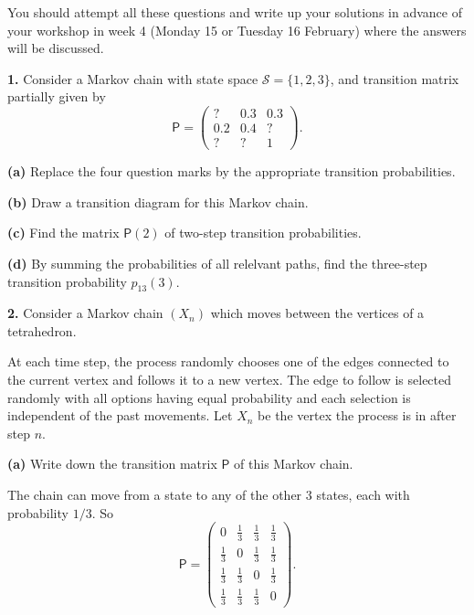 \documentclass[
  a4paper,
]{article}
\newif\ifcomm\commtrue
\theoremstyle{definition}
\theoremstyle{definition}
\theoremstyle{definition}
\theoremstyle{remark}
\begin{document}
\commfalse

You should attempt all these questions and write up your solutions in advance of your workshop in week 4 (Monday 15 or Tuesday 16 February) where the answers will be discussed.

\textbf{1.} Consider a Markov chain with state space \(\mathcal S = \{1,2,3\}\), and transition matrix partially given by
\[ \mathsf P = \begin{pmatrix} ? & 0.3 & 0.3 \\ 0.2 & 0.4 & ? \\ ? & ? & 1 \end{pmatrix} . \]

\textbf{(a)} Replace the four question marks by the appropriate transition probabilities.

\textbf{(b)} Draw a transition diagram for this Markov chain.

\textbf{(c)} Find the matrix \(\mathsf P(2)\) of two-step transition probabilities.

\textbf{(d)} By summing the probabilities of all relelvant paths, find the three-step transition probability \(p_{13}(3)\).

\textbf{2.} Consider a Markov chain \((X_n)\) which moves between the vertices of
a tetrahedron.

At each time step, the process randomly chooses one of the edges connected to the current vertex and follows it to a new vertex. The edge to follow is selected randomly with all options having equal probability and each selection is independent of the past movements. Let \(X_n\) be the vertex the process is in after step \(n\).

\textbf{(a)} Write down the transition matrix \(\mathsf P\) of this Markov chain.

\begin{myanswers}

The chain can move from a state to any of the other \(3\) states, each with probability \(1/3\). So
\[ \mathsf P = \begin{pmatrix} 0 & \frac13 & \frac13 & \frac13 \\
                               \frac13 & 0 & \frac13 & \frac13 \\
                               \frac13 & \frac13 & 0 & \frac13 \\
                               \frac13 & \frac13 & \frac13 & 0 \end{pmatrix} . \]

\end{myanswers}
\end{document}
